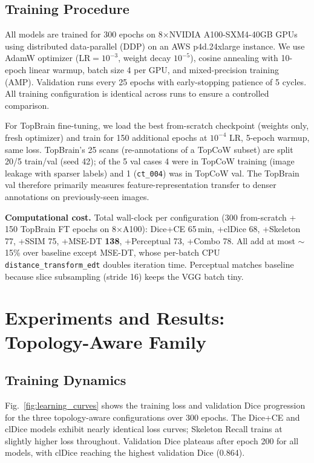 \documentclass[conference]{IEEEtran}
\begin{document}
\subsection{Training Procedure}

All models are trained for 300 epochs on 8$\times$NVIDIA A100-SXM4-40GB GPUs using distributed data-parallel (DDP) on an AWS p4d.24xlarge instance. We use AdamW optimizer ($\text{LR}=10^{-3}$, weight decay $10^{-5}$), cosine annealing with 10-epoch linear warmup, batch size 4 per GPU, and mixed-precision training (AMP). Validation runs every 25 epochs with early-stopping patience of 5 cycles. All training configuration is identical across runs to ensure a controlled comparison.

For TopBrain fine-tuning, we load the best from-scratch checkpoint (weights only, fresh optimizer) and train for 150 additional epochs at $10^{-4}$ LR, 5-epoch warmup, same loss. TopBrain's 25 scans (re-annotations of a TopCoW subset) are split 20/5 train/val (seed 42); of the 5 val cases 4 were in TopCoW training (image leakage with sparser labels) and 1 (\texttt{ct\_004}) was in TopCoW val. The TopBrain val therefore primarily measures feature-representation transfer to denser annotations on previously-seen images.

\textbf{Computational cost.} Total wall-clock per configuration (300 from-scratch + 150 TopBrain FT epochs on 8$\times$A100): Dice+CE 65\,min, +clDice 68, +Skeleton 77, +SSIM 75, +MSE-DT \textbf{138}, +Perceptual 73, +Combo 78. All add at most $\sim$15\% over baseline except MSE-DT, whose per-batch CPU \texttt{distance\_transform\_edt} doubles iteration time. Perceptual matches baseline because slice subsampling (stride 16) keeps the VGG batch tiny.

\section{Experiments and Results: Topology-Aware Family}

\subsection{Training Dynamics}

Fig.~\ref{fig:learning_curves} shows the training loss and validation Dice progression for the three topology-aware configurations over 300 epochs. The Dice+CE and clDice models exhibit nearly identical loss curves; Skeleton Recall trains at slightly higher loss throughout. Validation Dice plateaus after epoch 200 for all models, with clDice reaching the highest validation Dice (0.864).
\end{document}
